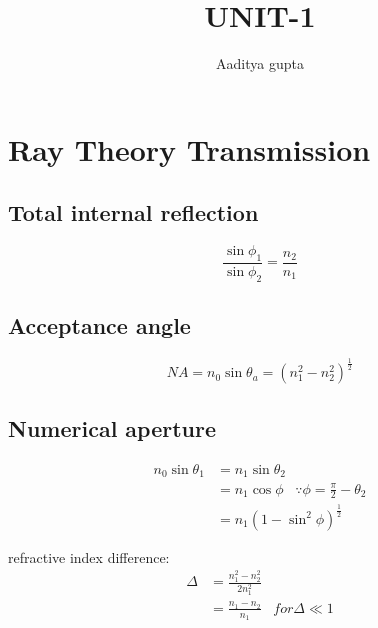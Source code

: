 \documentclass[12pt, onecolumn]{article}
\title{\bf{UNIT-1}}
\author{Aaditya gupta}
\begin{document}
\maketitle

\section{Ray Theory Transmission}
    \subsection{Total internal reflection}
        \begin{equation}
            \frac{\sin\phi_1}{\sin\phi_2} = \frac{n_2}{n_1}
            \label{eq:snell_law}
        \end{equation}

    \subsection{Acceptance angle}
        \begin{equation}
            NA = n_0 \sin\theta_a = (n_1^2 - n_2^2)^\frac{1}{2}
            \label{eq:acceptance_angle}
        \end{equation}

    \subsection{Numerical aperture}
        \begin{equation}
            \begin{aligned}
                n_0 \sin\theta_1 &= n_1 \sin\theta_2 \\
                            &= n_1 \cos\phi  \;\;\; \because \phi = \frac{\pi}{2} - \theta_2 \\
                            &= n_1 (1 - \sin^2 \phi)^\frac{1}{2}
            \end{aligned}
        \end{equation}
        
        
        refractive index difference:
        \begin{equation}
            \begin{aligned}
                \Delta   &= \frac{n_1^2 - n_2^2}{2n_1^2} \\
                    &= \frac{n_1 - n_2}{n_1} \;\;\; for \Delta \ll 1
            \end{aligned}
        \end{equation}
        
\end{document}
